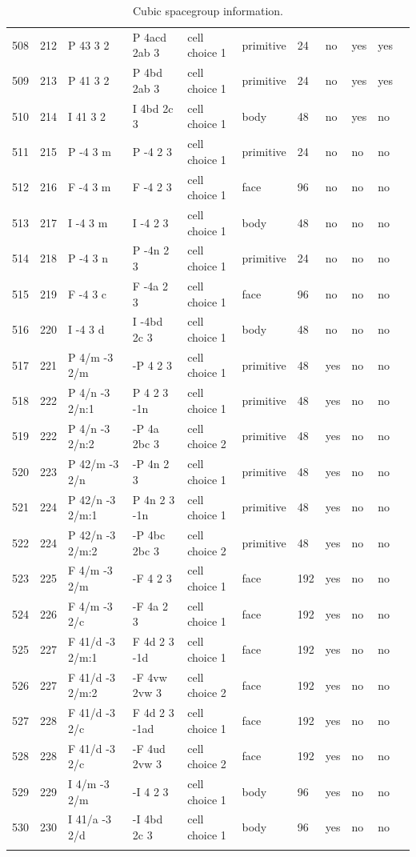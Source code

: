 \begin{center}
\begin{small}
\begin{longtable}{|l|l|l|l|l|l|l|l|l|l|l|}
508 &212 &P 43 3 2 &P 4acd 2ab 3 &cell choice 1 &primitive &24 &no &yes &yes \\ 
509 &213 &P 41 3 2 &P 4bd 2ab 3 &cell choice 1 &primitive &24 &no &yes &yes \\ 
510 &214 &I 41 3 2 &I 4bd 2c 3 &cell choice 1 &body &48 &no &yes &no \\ 
511 &215 &P -4 3 m &P -4 2 3 &cell choice 1 &primitive &24 &no &no &no \\ 
512 &216 &F -4 3 m &F -4 2 3 &cell choice 1 &face &96 &no &no &no \\ 
513 &217 &I -4 3 m &I -4 2 3 &cell choice 1 &body &48 &no &no &no \\ 
514 &218 &P -4 3 n &P -4n 2 3 &cell choice 1 &primitive &24 &no &no &no \\ 
515 &219 &F -4 3 c &F -4a 2 3 &cell choice 1 &face &96 &no &no &no \\ 
516 &220 &I -4 3 d &I -4bd 2c 3 &cell choice 1 &body &48 &no &no &no \\ 
517 &221 &P 4/m -3 2/m &-P 4 2 3 &cell choice 1 &primitive &48 &yes &no &no \\ 
518 &222 &P 4/n -3 2/n:1 &P 4 2 3 -1n &cell choice 1 &primitive &48 &yes &no &no \\ 
519 &222 &P 4/n -3 2/n:2 &-P 4a 2bc 3 &cell choice 2 &primitive &48 &yes &no &no \\ 
520 &223 &P 42/m -3 2/n &-P 4n 2 3 &cell choice 1 &primitive &48 &yes &no &no \\ 
521 &224 &P 42/n -3 2/m:1 &P 4n 2 3 -1n &cell choice 1 &primitive &48 &yes &no &no \\ 
522 &224 &P 42/n -3 2/m:2 &-P 4bc 2bc 3 &cell choice 2 &primitive &48 &yes &no &no \\ 
523 &225 &F 4/m -3 2/m &-F 4 2 3 &cell choice 1 &face &192 &yes &no &no \\ 
524 &226 &F 4/m -3 2/c &-F 4a 2 3 &cell choice 1 &face &192 &yes &no &no \\ 
525 &227 &F 41/d -3 2/m:1 &F 4d 2 3 -1d &cell choice 1 &face &192 &yes &no &no \\ 
526 &227 &F 41/d -3 2/m:2 &-F 4vw 2vw 3 &cell choice 2 &face &192 &yes &no &no \\ 
527 &228 &F 41/d -3 2/c &F 4d 2 3 -1ad &cell choice 1 &face &192 &yes &no &no \\ 
528 &228 &F 41/d -3 2/c &-F 4ud 2vw 3 &cell choice 2 &face &192 &yes &no &no \\ 
529 &229 &I 4/m -3 2/m &-I 4 2 3 &cell choice 1 &body &96 &yes &no &no \\ 
530 &230 &I 41/a -3 2/d &-I 4bd 2c 3 &cell choice 1 &body &96 &yes &no &no \\ 
\hline
\caption{Cubic spacegroup information.}
\end{longtable}
\end{small}
\end{center}

\newpage



